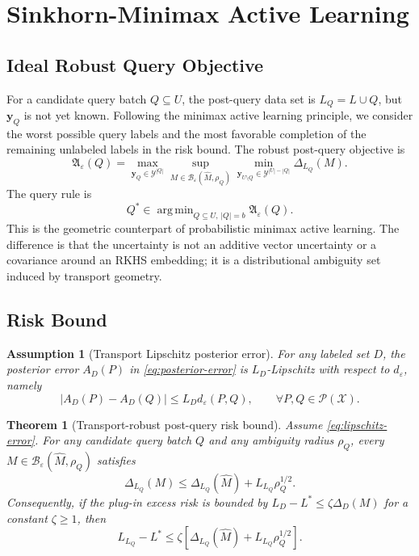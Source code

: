 \documentclass[11pt,a4paper]{article}
\newtheorem{assumption}{Assumption}
\newtheorem{theorem}{Theorem}
\DeclareMathOperator*{\argmin}{arg\,min}
\newcommand{\cY}{\mathcal{Y}}
\newcommand{\cX}{\mathcal{X}}
\newcommand{\cP}{\mathcal{P}}
\newcommand{\cB}{\mathcal{B}}
\newcommand{\abs}[1]{\left\lvert #1\right\rvert}
\begin{document}
\section{Sinkhorn-Minimax Active Learning}

\subsection{Ideal Robust Query Objective}

For a candidate query batch $Q\subseteq U$, the post-query data set is $L_Q=L\cup Q$, but $\bm y_Q$ is not yet known. Following the minimax active learning principle, we consider the worst possible query labels and the most favorable completion of the remaining unlabeled labels in the risk bound. The robust post-query objective is
\begin{equation}
\mathfrak{A}_\varepsilon(Q)
=\max_{\bm y_Q\in\cY^{|Q|}}
\sup_{M\in\cB_\varepsilon(\widehat M,\rho_Q)}
\min_{\bm y_{U\setminus Q}\in\cY^{|U|-|Q|}}
\Delta_{L_Q}(M).
\label{eq:robust-acquisition-general}
\end{equation}
The query rule is
\begin{equation}
Q^*\in\argmin_{Q\subseteq U,\,|Q|=b}\mathfrak{A}_\varepsilon(Q).
\label{eq:s-mald-query}
\end{equation}
This is the geometric counterpart of probabilistic minimax active learning. The difference is that the uncertainty is not an additive vector uncertainty or a covariance around an RKHS embedding; it is a distributional ambiguity set induced by transport geometry.

\subsection{Risk Bound}

\begin{assumption}[Transport Lipschitz posterior error]
For any labeled set $D$, the posterior error $A_D(P)$ in \eqref{eq:posterior-error} is $L_D$-Lipschitz with respect to $d_\varepsilon$, namely
\begin{equation}
\abs{A_D(P)-A_D(Q)}\le L_D d_\varepsilon(P,Q),
\qquad \forall P,Q\in\cP(\cX).
\label{eq:lipschitz-error}
\end{equation}
\end{assumption}

\begin{theorem}[Transport-robust post-query risk bound]
\label{thm:robust-risk-bound}
Assume \cref{eq:lipschitz-error}. For any candidate query batch $Q$ and any ambiguity radius $\rho_Q$, every $M\in\cB_\varepsilon(\widehat M,\rho_Q)$ satisfies
\begin{equation}
\Delta_{L_Q}(M)
\le \Delta_{L_Q}(\widehat M)+L_{L_Q}\rho_Q^{1/2}.
\label{eq:delta-transport-bound}
\end{equation}
Consequently, if the plug-in excess risk is bounded by $L_D-L^*\le \zeta\Delta_D(M)$ for a constant $\zeta\ge 1$, then
\begin{equation}
L_{L_Q}-L^*
\le \zeta\left[\Delta_{L_Q}(\widehat M)+L_{L_Q}\rho_Q^{1/2}\right].
\label{eq:excess-bound}
\end{equation}
\end{theorem}
\end{document}
